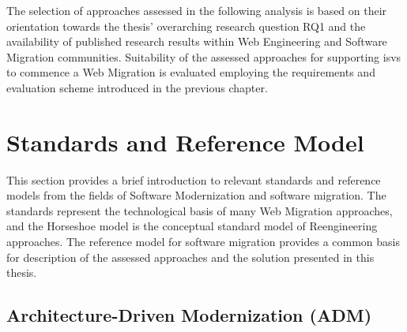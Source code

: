 The selection of approaches assessed in the following analysis is based on their orientation towards the thesis' overarching research question RQ1 and the availability of published research results within \gls{Web Engineering} and \gls{Software Migration} communities.
Suitability of the assessed approaches for supporting \glspl{isv} to commence a \gls{Web Migration} is evaluated employing the requirements and evaluation scheme introduced in the previous chapter.


\vspace{-15pt}
\hypertarget{standards-and-reference-models}{%
\section{Standards and Reference Model}\label{standards-and-reference-models}}
\vspace{15pt}

This section provides a brief introduction to relevant standards and reference models from the fields of \gls{Software Modernization} and software migration.
The standards represent the technological basis of many \gls{Web Migration} approaches, and the Horseshoe model is the conceptual standard model of \gls{Reengineering} approaches.
The reference model for software migration provides a common basis for description of the assessed approaches and the solution presented in this thesis.

\vspace{-10pt}
\hypertarget{sec:adm}{%
\subsection{Architecture-Driven Modernization (ADM)}\label{sec:adm}}
\vspace{10pt}

